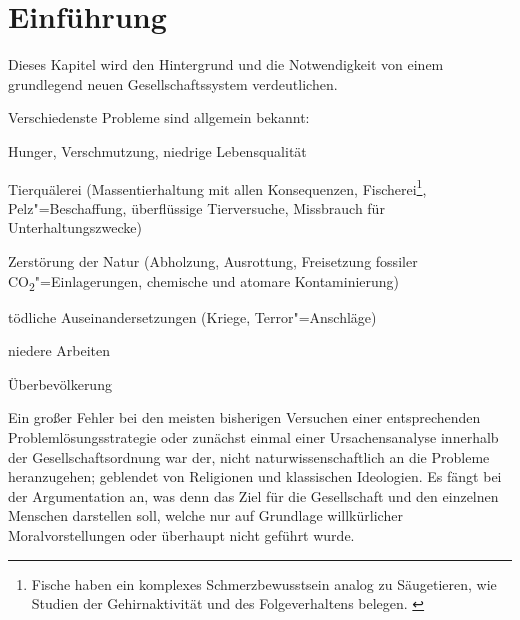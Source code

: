 \chapter{Einführung}\label{chap:introduction}

Dieses Kapitel wird den Hintergrund und die Notwendigkeit von einem grundlegend neuen Gesellschaftssystem verdeutlichen.

Verschiedenste Probleme sind allgemein bekannt:
\medskip
\begin{compactitem}
\item Hunger, Verschmutzung, niedrige Lebensqualität
\item Tierquälerei (Massentierhaltung mit allen Konsequenzen, Fischerei\footnote{Fische haben ein komplexes Schmerzbewusstsein analog zu Säugetieren, wie Studien der Gehirnaktivität und des Folgeverhaltens belegen. \citep{spiegel_10_2011}}, Pelz"=Beschaffung, überflüssige Tierversuche, Missbrauch für Unterhaltungszwecke)
\item Zerstörung der Natur (Abholzung, Ausrottung, Freisetzung fossiler CO\textsubscript{2}"=Einlagerungen, chemische und atomare Kontaminierung)
\item tödliche Auseinandersetzungen (Kriege, Terror"=Anschläge)
\item niedere Arbeiten
\item Überbevölkerung
\end{compactitem}
\medskip

Ein großer Fehler bei den meisten bisherigen Versuchen einer entsprechenden Problemlösungsstrategie oder zunächst einmal einer Ursachensanalyse innerhalb der Gesellschaftsordnung war der, nicht naturwissenschaftlich an die Probleme heranzugehen; geblendet von Religionen und klassischen Ideologien. Es fängt bei der Argumentation an, was denn das Ziel für die Gesellschaft und den einzelnen Menschen darstellen soll, welche nur auf Grundlage willkürlicher Moralvorstellungen oder überhaupt nicht geführt wurde.
